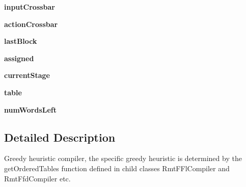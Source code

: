\begin{DoxyCompactItemize}
\item 
\hypertarget{classmapper_1_1src_1_1rmt_1_1rmt__greedy__compiler_1_1_rmt_greedy_compiler_a32c678217db3abc6899fc067a6d006db}{}{\bfseries input\+Crossbar}\label{classmapper_1_1src_1_1rmt_1_1rmt__greedy__compiler_1_1_rmt_greedy_compiler_a32c678217db3abc6899fc067a6d006db}

\item 
\hypertarget{classmapper_1_1src_1_1rmt_1_1rmt__greedy__compiler_1_1_rmt_greedy_compiler_a59fb735789a87da78836b732dd571ee8}{}{\bfseries action\+Crossbar}\label{classmapper_1_1src_1_1rmt_1_1rmt__greedy__compiler_1_1_rmt_greedy_compiler_a59fb735789a87da78836b732dd571ee8}

\item 
\hypertarget{classmapper_1_1src_1_1rmt_1_1rmt__greedy__compiler_1_1_rmt_greedy_compiler_a5dec757d516786e121913fdfb22249e4}{}{\bfseries last\+Block}\label{classmapper_1_1src_1_1rmt_1_1rmt__greedy__compiler_1_1_rmt_greedy_compiler_a5dec757d516786e121913fdfb22249e4}

\item 
\hypertarget{classmapper_1_1src_1_1rmt_1_1rmt__greedy__compiler_1_1_rmt_greedy_compiler_a562bcd62be31ac69c47300a884e5becf}{}{\bfseries assigned}\label{classmapper_1_1src_1_1rmt_1_1rmt__greedy__compiler_1_1_rmt_greedy_compiler_a562bcd62be31ac69c47300a884e5becf}

\item 
\hypertarget{classmapper_1_1src_1_1rmt_1_1rmt__greedy__compiler_1_1_rmt_greedy_compiler_a2a6cb9f87bcc37b0b127072b348e5cb0}{}{\bfseries current\+Stage}\label{classmapper_1_1src_1_1rmt_1_1rmt__greedy__compiler_1_1_rmt_greedy_compiler_a2a6cb9f87bcc37b0b127072b348e5cb0}

\item 
\hypertarget{classmapper_1_1src_1_1rmt_1_1rmt__greedy__compiler_1_1_rmt_greedy_compiler_a2f9165d45290bcf6a83be15955fba50b}{}{\bfseries table}\label{classmapper_1_1src_1_1rmt_1_1rmt__greedy__compiler_1_1_rmt_greedy_compiler_a2f9165d45290bcf6a83be15955fba50b}

\item 
\hypertarget{classmapper_1_1src_1_1rmt_1_1rmt__greedy__compiler_1_1_rmt_greedy_compiler_afd24d16810706eafc4a9e5e1e9b2d7ee}{}{\bfseries num\+Words\+Left}\label{classmapper_1_1src_1_1rmt_1_1rmt__greedy__compiler_1_1_rmt_greedy_compiler_afd24d16810706eafc4a9e5e1e9b2d7ee}

\end{DoxyCompactItemize}


\subsection{Detailed Description}
\begin{DoxyVerb}Greedy heuristic compiler, the specific greedy heuristic
is determined by the getOrderedTables function defined in
child classes RmtFFlCompiler and RmtFfdCompiler etc.
\end{DoxyVerb}
 

